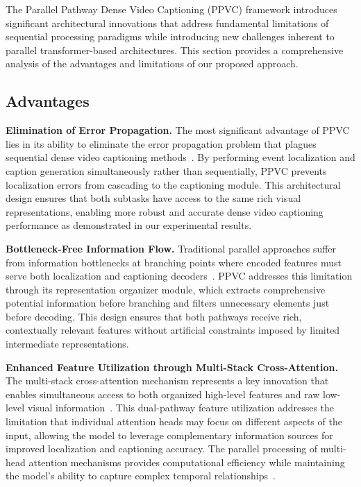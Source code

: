 The Parallel Pathway Dense Video Captioning (PPVC) framework introduces significant architectural innovations that address fundamental limitations of sequential processing paradigms while introducing new challenges inherent to parallel transformer-based architectures. This section provides a comprehensive analysis of the advantages and limitations of our proposed approach.

\subsection{Advantages}

\textbf{Elimination of Error Propagation.}
The most significant advantage of PPVC lies in its ability to eliminate the error propagation problem that plagues sequential dense video captioning methods~\cite{Krishna2017-pw,Li2018-ll,Wang2018-ap}.
By performing event localization and caption generation simultaneously rather than sequentially, PPVC prevents localization errors from cascading to the captioning module.
This architectural design ensures that both subtasks have access to the same rich visual representations, enabling more robust and accurate dense video captioning performance as demonstrated in our experimental results.

\textbf{Bottleneck-Free Information Flow.}
Traditional parallel approaches suffer from information bottlenecks at branching points where encoded features must serve both localization and captioning decoders~\cite{Wang2021-zi}. PPVC addresses this limitation through its representation organizer module, which extracts comprehensive potential information before branching and filters unnecessary elements just before decoding. This design ensures that both pathways receive rich, contextually relevant features without artificial constraints imposed by limited intermediate representations.

\textbf{Enhanced Feature Utilization through Multi-Stack Cross-Attention.}
The multi-stack cross-attention mechanism represents a key innovation that enables simultaneous access to both organized high-level features and raw low-level visual information~\cite{Vaswani2017-sc}. This dual-pathway feature utilization addresses the limitation that individual attention heads may focus on different aspects of the input, allowing the model to leverage complementary information sources for improved localization and captioning accuracy. The parallel processing of multi-head attention mechanisms provides computational efficiency while maintaining the model's ability to capture complex temporal relationships~\cite{Dosovitskiy2021-vn}.

